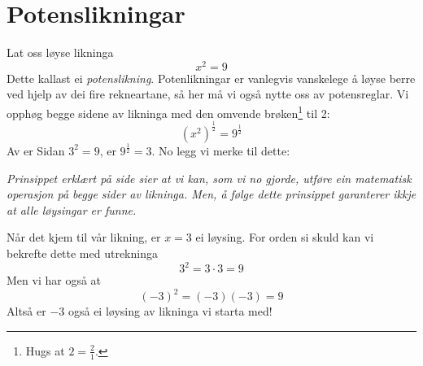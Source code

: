 \newpage
{}
\section{Potenslikningar}
Lat oss løyse likninga
\[ x^2=9 \]
Dette kallast ei \textit{potenslikning}. Potenlikningar er vanlegvis vanskelege å løyse berre ved hjelp av dei fire rekneartane, så her må vi også nytte oss av potensreglar. Vi opphøg begge sidene av likninga med den omvende brøken\footnote{Hugs at $ 2=\frac{2}{1} $.} til 2:
\[ \left(x^2\right)^\frac{1}{2}=9^\frac{1}{2} \]
Av  er
Sidan $ 3^2=9 $, er $ 9^\frac{1}{2}=3 $. No legg vi merke til dette: \vsk

\textit{Prinsippet erklært på side \pageref{principle} sier at vi kan, som vi no gjorde, utføre ein matematisk operasjon på begge sider av likninga. Men, å følge dette prinsippet garanterer ikkje at alle løysingar er funne.} \\ \vsk

Når det kjem til vår likning, er $ {x=3} $ ei løysing. For orden si skuld kan vi bekrefte dette med utrekninga
\[ 3^2=3\cdot3=9 \]
Men vi har også at
\[ (-3)^2=(-3)(-3)=9 \]
Altså er $ -3 $ også ei løysing av likninga vi starta med! \regv

